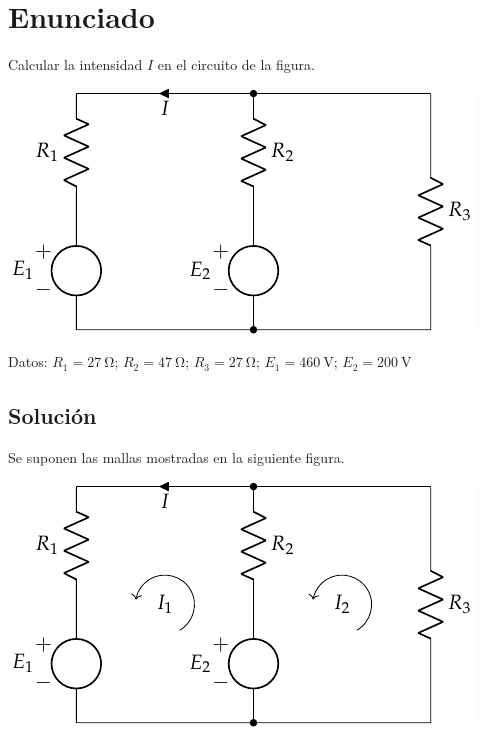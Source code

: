 
\section{Enunciado}
Calcular la intensidad $I$ en el circuito de la figura.

\begin{center}
  \includegraphics{figuras/BT1_04.pdf}
\end{center}

  Datos: $R_1 = \qty{27}{\ohm}$; $R_2 = \qty{47}{\ohm}$; $R_3 = \qty{27}{\ohm}$; $E_1 = \qty{460}{\volt}$; $E_2 = \qty{200}{\volt}$

\subsection*{Solución}
Se suponen las mallas mostradas en la siguiente figura.

\begin{center}
  \includegraphics{figuras/BT1_04_mallas.pdf}
\end{center}

